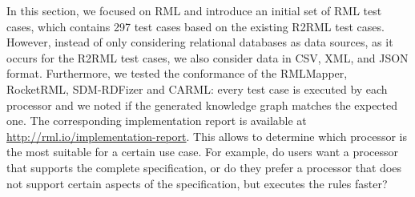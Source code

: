 In this section, we focused on RML and introduce an initial set of RML test cases, which contains 297 test cases based on the existing R2RML test cases. However, instead of only considering relational databases as data sources, as it occurs for the R2RML test cases, we also consider data in CSV, XML, and JSON format. Furthermore, we tested the conformance of the RMLMapper, RocketRML, SDM-RDFizer and CARML: every test case is executed by each processor and we noted if the generated knowledge graph matches the expected one. The corresponding implementation report is available at \url{http://rml.io/implementation-report}. This allows to determine which processor is the most suitable for a certain use case. For example, do users want a processor that supports the complete specification, or do they prefer a processor that does not support certain aspects of the specification, but executes the rules faster?


